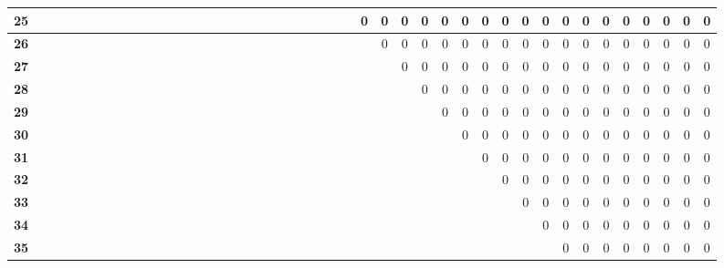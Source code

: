 \documentclass{article}
\begin{document}
\begin{table}[!ht]
\begin{adjustwidth}{-3cm}{-3cm}
\begin{tabular}{c||c|c|c|c|c|c|c|c|c|c|c|c|c|c|c|c|c|c|c|c|c|c|c|c|c|c|c|c|c|c|c|c|c|c|c|c|c|c|c|c|c|c|c|}
\multicolumn{1}{|c||}{\cellcolor{gray90}\textbf{25}} &  &  &  &  &  &  &  &  &  &  &  &  &  &  &  &  &  &  &  &  &  &  &  &  &  & 0 & 0 & 0 & 0 & 0 & 0 & 0 & 0 & 0 & 0 & 0 & 0 & 0 & 0 & 0 & 0 & 0 & 0 \\ \hline
\multicolumn{1}{|c||}{\cellcolor{gray90}\textbf{26}} &  &  &  &  &  &  &  &  &  &  &  &  &  &  &  &  &  &  &  &  &  &  &  &  &  &  & 0 & 0 & 0 & 0 & 0 & 0 & 0 & 0 & 0 & 0 & 0 & 0 & 0 & 0 & 0 & 0 & 0 \\ \hline
\multicolumn{1}{|c||}{\cellcolor{gray90}\textbf{27}} &  &  &  &  &  &  &  &  &  &  &  &  &  &  &  &  &  &  &  &  &  &  &  &  &  &  &  & 0 & 0 & 0 & 0 & 0 & 0 & 0 & 0 & 0 & 0 & 0 & 0 & 0 & 0 & 0 & 0 \\ \hline
\multicolumn{1}{|c||}{\cellcolor{gray90}\textbf{28}} &  &  &  &  &  &  &  &  &  &  &  &  &  &  &  &  &  &  &  &  &  &  &  &  &  &  &  &  & 0 & 0 & 0 & 0 & 0 & 0 & 0 & 0 & 0 & 0 & 0 & 0 & 0 & 0 & 0 \\ \hline
\multicolumn{1}{|c||}{\cellcolor{gray90}\textbf{29}} &  &  &  &  &  &  &  &  &  &  &  &  &  &  &  &  &  &  &  &  &  &  &  &  &  &  &  &  &  & 0 & 0 & 0 & 0 & 0 & 0 & 0 & 0 & 0 & 0 & 0 & 0 & 0 & 0 \\ \hline
\multicolumn{1}{|c||}{\cellcolor{gray90}\textbf{30}} &  &  &  &  &  &  &  &  &  &  &  &  &  &  &  &  &  &  &  &  &  &  &  &  &  &  &  &  &  &  & 0 & 0 & 0 & 0 & 0 & 0 & 0 & 0 & 0 & 0 & 0 & 0 & 0 \\ \hline
\multicolumn{1}{|c||}{\cellcolor{gray90}\textbf{31}} &  &  &  &  &  &  &  &  &  &  &  &  &  &  &  &  &  &  &  &  &  &  &  &  &  &  &  &  &  &  &  & 0 & 0 & 0 & 0 & 0 & 0 & 0 & 0 & 0 & 0 & 0 & 0 \\ \hline
\multicolumn{1}{|c||}{\cellcolor{gray90}\textbf{32}} &  &  &  &  &  &  &  &  &  &  &  &  &  &  &  &  &  &  &  &  &  &  &  &  &  &  &  &  &  &  &  &  & 0 & 0 & 0 & 0 & 0 & 0 & 0 & 0 & 0 & 0 & 0 \\ \hline
\multicolumn{1}{|c||}{\cellcolor{gray90}\textbf{33}} &  &  &  &  &  &  &  &  &  &  &  &  &  &  &  &  &  &  &  &  &  &  &  &  &  &  &  &  &  &  &  &  &  & 0 & 0 & 0 & 0 & 0 & 0 & 0 & 0 & 0 & 0 \\ \hline
\multicolumn{1}{|c||}{\cellcolor{gray90}\textbf{34}} &  &  &  &  &  &  &  &  &  &  &  &  &  &  &  &  &  &  &  &  &  &  &  &  &  &  &  &  &  &  &  &  &  &  & 0 & 0 & 0 & 0 & 0 & 0 & 0 & 0 & 0 \\ \hline
\multicolumn{1}{|c||}{\cellcolor{gray90}\textbf{35}} &  &  &  &  &  &  &  &  &  &  &  &  &  &  &  &  &  &  &  &  &  &  &  &  &  &  &  &  &  &  &  &  &  &  &  & 0 & 0 & 0 & 0 & 0 & 0 & 0 & 0 \\ \hline

\end{tabular}
\end{adjustwidth}
\end{table}
\end{document}
